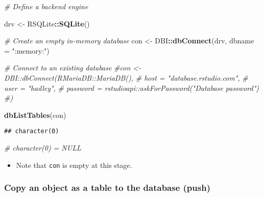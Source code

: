 \documentclass[
]{book}
\newenvironment{Shaded}{\begin{snugshade}}{\end{snugshade}}
\newcommand{\CommentTok}[1]{\textcolor[rgb]{0.56,0.35,0.01}{\textit{#1}}}
\newcommand{\DataTypeTok}[1]{\textcolor[rgb]{0.13,0.29,0.53}{#1}}
\newcommand{\KeywordTok}[1]{\textcolor[rgb]{0.13,0.29,0.53}{\textbf{#1}}}
\newcommand{\NormalTok}[1]{#1}
\newcommand{\OperatorTok}[1]{\textcolor[rgb]{0.81,0.36,0.00}{\textbf{#1}}}
\newcommand{\StringTok}[1]{\textcolor[rgb]{0.31,0.60,0.02}{#1}}
\providecommand{\tightlist}{%
  \setlength{\itemsep}{0pt}\setlength{\parskip}{0pt}}
\begin{document}
\begin{Shaded}
\begin{Highlighting}[]
\CommentTok{\# Define a backend engine }

\NormalTok{drv \textless{}{-}}\StringTok{ }\NormalTok{RSQLite}\OperatorTok{::}\KeywordTok{SQLite}\NormalTok{()}

\CommentTok{\# Create an empty in{-}memory database }
\NormalTok{con \textless{}{-}}\StringTok{ }\NormalTok{DBI}\OperatorTok{::}\KeywordTok{dbConnect}\NormalTok{(drv, }
                      \DataTypeTok{dbname =} \StringTok{":memory:"}\NormalTok{)}

\CommentTok{\# Connect to an existing database }
\CommentTok{\#con \textless{}{-} DBI::dbConnect(RMariaDB::MariaDB(), }
 \CommentTok{\# host = "database.rstudio.com",}
 \CommentTok{\# user = "hadley",}
 \CommentTok{\# password = rstudioapi::askForPassword("Database password")}
\CommentTok{\#)}

\KeywordTok{dbListTables}\NormalTok{(con)}
\end{Highlighting}
\end{Shaded}

\begin{verbatim}
## character(0)
\end{verbatim}

\begin{Shaded}
\begin{Highlighting}[]
\CommentTok{\# character(0) = NULL}
\end{Highlighting}
\end{Shaded}

\begin{itemize}
\tightlist
\item
  Note that \texttt{con} is empty at this stage.
\end{itemize}

\hypertarget{copy-an-object-as-a-table-to-the-database-push}{%
\subsubsection{Copy an object as a table to the database (push)}\label{copy-an-object-as-a-table-to-the-database-push}}
\end{document}
